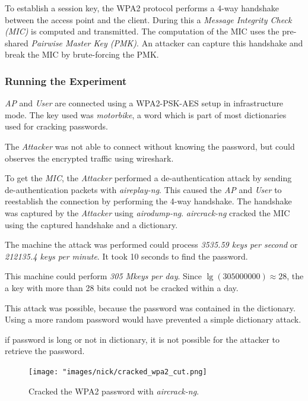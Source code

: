 \documentclass[12pt,a4paper]{article}
\begin{document}
	To establish a session key, the WPA2 protocol performs a 4-way handshake between the access point and the client. During this a \emph{Message Integrity Check (MIC)} is computed and transmitted. The computation of the MIC uses the pre-shared \emph{Pairwise Master Key (PMK)}. An attacker can capture this handshake and break the MIC by brute-forcing the PMK.
	
	\subsubsection{Running the Experiment}
	\emph{AP} and \emph{User} are connected using a WPA2-PSK-AES setup in infrastructure mode. The key used was \emph{motorbike}, a word which is part of most dictionaries used for cracking passwords.
	
	The \emph{Attacker} was not able to connect without knowing the password, but could observes the encrypted traffic using wireshark.
	
	To get the \emph{MIC}, the \emph{Attacker} performed a de-authentication attack by sending de-authentication packets with \emph{aireplay-ng}.
	This caused the \emph{AP} and \emph{User} to reestablish the connection by performing the 4-way handshake.
	The handshake was captured by the \emph{Attacker} using \emph{airodump-ng}.
	\emph{aircrack-ng} cracked the MIC using the captured handshake and a dictionary.
	
	The machine the attack was performed could process \emph{3535.59 keys per second} or \emph{212135.4 keys per minute}. It took 10 seconds to find the password.
	
	This machine could perform \emph{305 Mkeys per day}.
	Since $\lg(305000000) \approx 28$, the a key with more than 28 bits could not be cracked within a day.
	
	This attack was possible, because the password was contained in the dictionary. Using a more random password would have prevented a simple dictionary attack.
	
	if password is long or not in dictionary, it is not possible for the attacker to retrieve the password.
	\begin{figure}
		\texttt{[image: "images/nick/cracked\_wpa2\_cut.png]}
		\caption{Cracked the WPA2 password with \emph{aircrack-ng}.}
		\label{wpa:crack}
	\end{figure}
	
\end{document}
